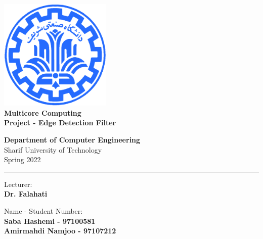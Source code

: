 \documentclass[12pt]{article}
\begin{document}
	
	
	\begin{titlepage}
		\begin{center}
			
			\vspace*{0.7cm}
			
			\includegraphics[width=0.4\textwidth]{sharif1.png}\\
			\vspace{0.5cm}
			\textbf{ \Huge{Multicore Computing} }\\
			\vspace{0.5cm}
			\textbf{ \Large{ Project - Edge Detection Filter} }
			\vspace{0.2cm}
			
			
			\large \textbf{Department of Computer Engineering}\\\vspace{0.2cm}
			\large   Sharif University of Technology\\\vspace{0.2cm}
			\large   Spring 2022 \\\vspace{0.2cm}
			\noindent\rule[1ex]{\linewidth}{1pt}
			Lecturer:\\
			\textbf{{Dr. Falahati}}
			
			
			\vspace{0.15cm}
			Name - Student Number:\\
			
			\textbf{{Saba Hashemi - 97100581}}\\
			
			\textbf{{Amirmahdi Namjoo - 97107212}}
		\end{center}
	\end{titlepage}
	
	
	\newpage
	\pagestyle{fancy}
	\fancyhf{}
	\fancyfoot{}
	\cfoot{\thepage}
	
\end{document}
